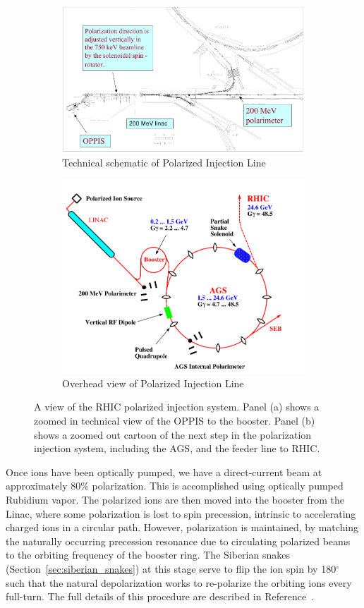 \begin{figure}
  \centering
  \begin{subfigure}[b]{\textwidth}
    \centering
    \includegraphics[width=0.7\linewidth]{./figures/rhic_polarized_injector.png}
		\caption{
			Technical schematic of Polarized Injection Line \cite{Zelenski2007}
		}
    \label{fig:polarized_top_view_1} 
  \end{subfigure}
  \begin{subfigure}[b]{\textwidth}
    \centering
    \includegraphics[width=0.7\linewidth]{./figures/polarized_beam_rhic_complex.png}
		\caption{
			Overhead view of Polarized Injection Line \cite{RHIC2006}
		}
    \label{fig:polarized_top_view_2}
  \end{subfigure}
  \caption{
    A view of the RHIC polarized injection system. Panel (a) shows a zoomed in
    technical view of the OPPIS to the booster. Panel (b) shows a zoomed out
    cartoon of the next step in the polarization injection system, including
    the AGS, and the feeder line to RHIC.
  }
  \label{fig:rhic_polarized_beam_line}
\end{figure}

Once ions have been optically pumped, we have a direct-current beam at
approximately 80\% polarization. This is accomplished using optically pumped
Rubidium vapor. The polarized ions are then moved into the booster from the
Linac, where some polarization is lost to spin precession, intrinsic to
accelerating charged ions in a circular path. However, polarization is
maintained, by matching the naturally occurring precession resonance due to
circulating polarized beams to the orbiting frequency of the booster ring.  The
Siberian snakes (Section~\ref{sec:siberian_snakes}) at this stage serve to flip
the ion spin by 180$^\circ$ such that the natural depolarization works to
re-polarize the orbiting ions every full-turn. The full details of this
procedure are described in Reference~\cite{RHIC2006}.

